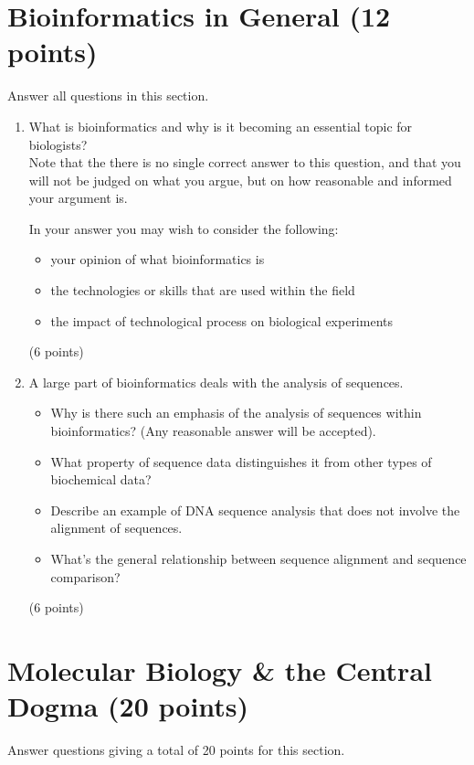 \documentclass[11pt]{article}
\begin{document}
\section{Bioinformatics in General (12 points)}
Answer all questions in this section.
\begin{enumerate}
\item What is bioinformatics and why is it becoming an essential topic for
  biologists?\\
  Note that the there is no single correct answer to this question, and that
  you will not be judged on what you argue, but on how reasonable and informed
  your argument is.
  
  In your answer you may wish to consider the following:
  \begin{itemize}
  \item your opinion of what bioinformatics is
  \item the technologies or skills that are used within the field
  \item the impact of technological process on biological experiments
  \end{itemize}
  (6 points)

\item A large part of bioinformatics deals with the analysis of sequences.
  \begin{itemize}
  \item Why is there such an emphasis of the analysis of sequences within
    bioinformatics? (Any reasonable answer will be accepted).\\
  \item What property of sequence data distinguishes it from other types of
    biochemical data?
  \item Describe an example of DNA sequence analysis that does not involve the
    alignment of sequences.\\
  \item What's the general relationship between sequence alignment and
    sequence comparison?\\
  \end{itemize}
  (6 points)
\end{enumerate}


\section{Molecular Biology \& the Central Dogma (20 points)}
Answer questions giving a total of 20 points for this section.
  
\end{document}
